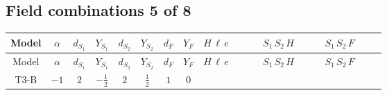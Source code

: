 \documentclass[8pt]{article}
\begin{document}
\begin{landscape}
\subsection*{Field combinations 5 of 8}
\begin{longtable}{@{}cccccccc >{\raggedright\arraybackslash}p{0.21\linewidth} >{\raggedright\arraybackslash}p{0.21\linewidth} >{\raggedright\arraybackslash}p{0.21\linewidth}@{}}
\toprule
Model & $\alpha$ & $d_{S_1}$ & $Y_{S_1}$ & $d_{S_2}$ & $Y_{S_2}$ & $d_F$ & $Y_F$ & $H\,\ell\,e$ & $S_1\,S_2\,H$ & $S_1\,S_2\,F$ \\
\midrule
\endfirsthead
\toprule
Model & $\alpha$ & $d_{S_1}$ & $Y_{S_1}$ & $d_{S_2}$ & $Y_{S_2}$ & $d_F$ & $Y_F$ & $H\,\ell\,e$ & $S_1\,S_2\,H$ & $S_1\,S_2\,F$ \\
\midrule
\endhead
T3-B & $-1$ & $2$ & $-\frac{1}{2}$ & $2$ & $\frac{1}{2}$ & $1$ & $0$ & \scriptsize\adjustbox{max width=\linewidth}{$\begin{gathered} +\frac{\hbar  \overline{y_{1,i_3,r_1}} \overline{L_{a_1,i_2}}\, P_R\, e_{i_1} H_{a_1} y_{1,i_2,r_1} Y_{e,i_3,i_1}}{4 \epsilon } \\ +\frac{3}{8} \hbar  \overline{y_{1,i_3,r_1}} \overline{L_{a_1,i_2}}\, P_R\, e_{i_1} H_{a_1} y_{1,i_2,r_1} Y_{e,i_3,i_1} \\ +\frac{\hbar  \overline{y_{2,i_3,r_1}} \overline{L_{a_1,i_2}}\, P_R\, e_{i_1} H_{a_1} y_{2,i_2,r_1} Y_{e,i_3,i_1}}{4 \epsilon }\end{gathered}$} & \scriptsize\adjustbox{max width=\linewidth}{$\begin{gathered} -\frac{2 \hbar  \overline{y_{2,i_1,r_1}} \overline{Y_{e,i_2,i_3}} H_{a_2} S_{1,j_1} S_{2,j_2} y_{1,i_2,r_1} Y_{e,i_1,i_3} \mathcal{I}_{y_1,a_1,j_1} {\mathcal{C}_{LS_2F}}^{*}_{a_2,j_2} H_{a_1}{}^{\dagger }}{\epsilon } \\ -2 \hbar  \overline{y_{2,i_1,r_1}} \overline{Y_{e,i_2,i_3}} H_{a_2} S_{1,j_1} S_{2,j_2} y_{1,i_2,r_1} Y_{e,i_1,i_3} \mathcal{I}_{y_1,a_1,j_1} {\mathcal{C}_{LS_2F}}^{*}_{a_2,j_2} H_{a_1}{}^{\dagger } \\ +\overline{\lambda_5} S_{2,j_2} {\mathcal{I}_{LLS_1S_2}}^{*}_{a_1,a_2,j_1,j_2} H_{a_1}{}^{\dagger } H_{a_2}{}^{\dagger } S_{1,j_1}{}^{\dagger }\end{gathered}$} & \scriptsize\adjustbox{max width=\linewidth}{$\begin{gathered} +C_{S_2^\dagger S_2} \hbar  \log \left(\frac{\bar{\mu}^{2}}{M_F^2}\right) \overline{y_{2,i_1,r_1}} S_{1,j_1} S_{2,j_2} y_{1,i_1,r_1} \text{Bar}(\text{cg1})_{j_1,j_2} \\ -\hbar  \log \left(\frac{\bar{\mu}^{2}}{M_F^2}\right) \overline{y_{2,i_1,r_1}} \overline{y_{2,i_2,r_2}} S_{1,j_1} S_{1,j_3} S_{2,j_2} S_{2,j_4} y_{1,i_1,r_2} y_{1,i_2,r_1} \text{Bar}(\text{cg1})_{j_1,j_2} \text{Bar}(\text{cg1})_{j_3,j_4} \\ +2 \hbar  \log \left(\frac{\bar{\mu}^{2}}{M_F^2}\right) \overline{y_{1,i_1,r_1}} \overline{y_{2,i_2,r_2}} S_{1,j_1} S_{1,j_2} S_{2,j_3} y_{1,i_1,r_2} y_{1,i_2,r_1} \text{Bar}(\text{cg1})_{j_2,j_3} S_{1,j_1}{}^{\dagger }\end{gathered}$} \\

\end{longtable}
\end{landscape}
\end{document}
